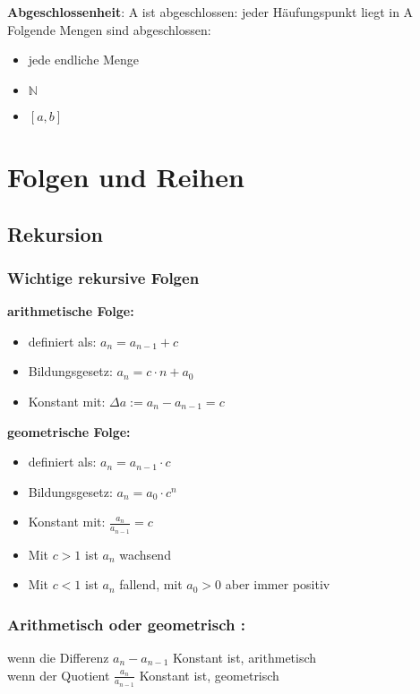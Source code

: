 \documentclass[12pt,a4paper]{article}
\begin{document}
\textbf{Abgeschlossenheit}: 
A ist abgeschlossen: jeder Häufungspunkt liegt in A\\
Folgende Mengen sind abgeschlossen:
\begin{itemize}
	\item jede endliche Menge
	\item $\mathbb{N}$
	\item $[a,b]$ 
\end{itemize}

\pagebreak
\section{Folgen und Reihen}
\subsection{Rekursion}
\subsubsection{Wichtige rekursive Folgen}

\textbf{arithmetische Folge:}
\begin{itemize}
\item definiert als: $a_n = a_{n-1} + c $
\item Bildungsgesetz: $a_n = c\cdot n+a_0$
\item Konstant mit: $\Delta a := a_n - a_{n-1} = c$
\end{itemize}

\textbf{geometrische Folge:}
\begin{itemize}
\item definiert als: $a_n = a_{n-1}\cdot c$
\item Bildungsgesetz: $a_n = a_0\cdot c^n$
\item Konstant mit: $\frac{a_n}{a_{n-1}}=c$
\item Mit $c>1$ ist $a_n$ wachsend
\item Mit $c<1$ ist $a_n$ fallend, mit $a_0>0$ aber immer positiv
\end{itemize}

\subsubsection{Arithmetisch oder geometrisch :}
wenn die Differenz $a_n-a_{n-1}$ Konstant ist, arithmetisch\\
wenn der Quotient $\frac{a_n}{a_{n-1}}$ Konstant ist, geometrisch\\
\end{document}
